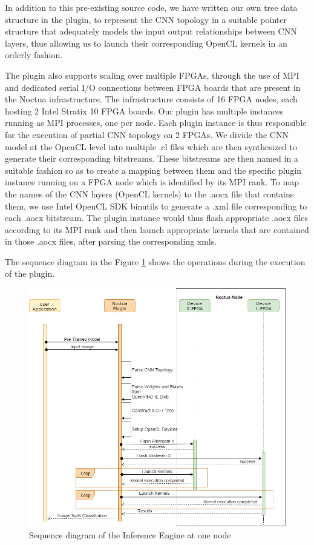  In addition to this pre-existing source code, we have written our own tree data structure in the plugin, to represent the CNN topology in a suitable pointer structure that adequately models the input output relationships between CNN layers, thus allowing us to launch their corresponding OpenCL kernels in an orderly fashion. 
 
 The plugin also supports scaling over multiple FPGAs, through the use of MPI and dedicated serial I/O connections between FPGA boards that are present in the Noctua infrastructure. The infrastructure consists of 16 FPGA nodes, each hosting 2 Intel Stratix 10 FPGA boards. Our plugin has multiple instances running as MPI processes, one per node. Each plugin instance is thus responsible for the execution of partial CNN topology on 2 FPGAs. We divide the CNN model at the OpenCL level into multiple .cl files which are then synthesized to generate their corresponding bitstreams. These bitstreams are then named in a suitable fashion so as to create a mapping between them and the specific plugin instance running on a FPGA node which is identified by its MPI rank. To map the names of the CNN layers (OpenCL kernels) to the .aocx file that contains them, we use Intel OpenCL SDK binutils to generate a .xml file corresponding to each .aocx bitstream. The plugin instance would thus flash appropriate .aocx files according to its MPI rank and then launch appropriate kernels that are contained in those .aocx files, after parsing the corresponding xmls. 
 
 The sequence diagram in the Figure \ref{fig:plugin_uml} shows the operations during the execution of the plugin.
 \begin{figure}[!hbpt]
    \centering
    \includegraphics[width=\textwidth]{img/Plugin_UML_1.png}
    \caption{Sequence diagram of the Inference Engine at one node}
    \label{fig:plugin_uml}
\end{figure} 

